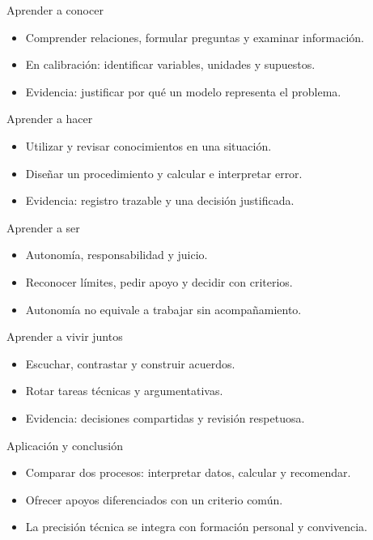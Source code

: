 \documentclass[
	spanish,
	aspectratio=1610,
	xcolor={dvipsnames,table}
]{beamer}
\begin{document}
\begin{frame}{Aprender a conocer}
\fontsize{14}{18}\selectfont\begin{itemize}\setlength{\itemsep}{.45cm}
\item Comprender relaciones, formular preguntas y examinar información.
\item En calibración: identificar variables, unidades y supuestos.
\item Evidencia: justificar por qué un modelo representa el problema.
\end{itemize}
\end{frame}
\begin{frame}{Aprender a hacer}
\fontsize{14}{18}\selectfont\begin{itemize}\setlength{\itemsep}{.45cm}
\item Utilizar y revisar conocimientos en una situación.
\item Diseñar un procedimiento y calcular e interpretar error.
\item Evidencia: registro trazable y una decisión justificada.
\end{itemize}
\end{frame}
\begin{frame}{Aprender a ser}
\fontsize{14}{18}\selectfont\begin{itemize}\setlength{\itemsep}{.45cm}
\item Autonomía, responsabilidad y juicio.
\item Reconocer límites, pedir apoyo y decidir con criterios.
\item Autonomía no equivale a trabajar sin acompañamiento.
\end{itemize}
\end{frame}
\begin{frame}{Aprender a vivir juntos}
\fontsize{14}{18}\selectfont\begin{itemize}\setlength{\itemsep}{.45cm}
\item Escuchar, contrastar y construir acuerdos.
\item Rotar tareas técnicas y argumentativas.
\item Evidencia: decisiones compartidas y revisión respetuosa.
\end{itemize}
\end{frame}
\begin{frame}{Aplicación y conclusión}
\fontsize{14}{18}\selectfont\begin{itemize}\setlength{\itemsep}{.45cm}
\item Comparar dos procesos: interpretar datos, calcular y recomendar.
\item Ofrecer apoyos diferenciados con un criterio común.
\item La precisión técnica se integra con formación personal y convivencia.
\end{itemize}
\end{frame}
\end{document}
